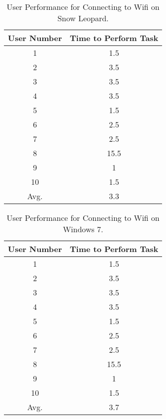 \documentclass[11pt,letterpaper]{report}
\begin{document}
\begin{table}
    \centering
    \begin{tabular}{| c | c |}
        \hline
        User Number & Time to Perform Task \\ \hline
        1 & 1.5 \\  \hline
        2 & 3.5 \\  \hline
        3 & 3.5 \\ \hline
        4 & 3.5 \\  \hline
        5 & 1.5 \\    \hline
        6 & 2.5 \\  \hline
        7 & 2.5 \\ \hline
        8 & 15.5 \\  \hline
        9 & 1 \\ \hline
        10 & 1.5 \\ \hline
        Avg. & 3.3 \\
        \hline
    \end{tabular}
    \caption{User Performance for Connecting to Wifi on Snow Leopard.}
    \label{wifiM}    
\end{table}

\begin{table}
    \centering
    \begin{tabular}{| c | c |}
        \hline
        User Number & Time to Perform Task \\ \hline
        1 & 1.5 \\  \hline
        2 & 3.5 \\  \hline
        3 & 3.5 \\ \hline
        4 & 3.5 \\  \hline
        5 & 1.5 \\    \hline
        6 & 2.5 \\  \hline
        7 & 2.5 \\ \hline
        8 & 15.5 \\  \hline
        9 & 1 \\ \hline
        10 & 1.5 \\ \hline
        Avg. & 3.7 \\
        \hline
    \end{tabular}
    \caption{User Performance for Connecting to Wifi on Windows 7.}
    \label{wifiW}    
\end{table}
\end{document}
